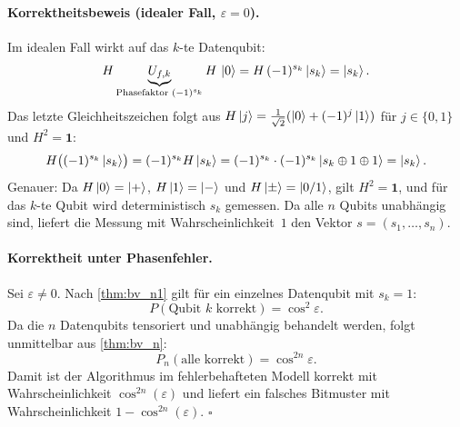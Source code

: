﻿\documentclass[11pt,a4paper]{article}
\theoremstyle{definition}
\newcommand{\eps}{\varepsilon}
\begin{document}
\paragraph{Korrektheitsbeweis (idealer Fall, $\varepsilon=0$).}
Im idealen Fall wirkt auf das $k$-te Datenqubit:
\[
  H \underbrace{U_{f,k}}_{\text{Phasefaktor }(-1)^{s_k}} H\,\ket{0}
  = H\,(-1)^{s_k}\ket{s_k} = \ket{s_k}.
\]
Das letzte Gleichheitszeichen folgt aus $H\ket{j}=\tfrac{1}{\sqrt{2}}(\ket{0}+(-1)^j\ket{1})$
für $j\in\{0,1\}$ und $H^2=\mathbf{1}$:
\[
  H\bigl((-1)^{s_k}\ket{s_k}\bigr) = (-1)^{s_k}H\ket{s_k}
  = (-1)^{s_k}\cdot(-1)^{s_k}\ket{s_k\oplus 1\oplus 1} = \ket{s_k}.
\]
Genauer: Da $H\ket{0}=\ket{+}$, $H\ket{1}=\ket{-}$ und $H\ket{\pm}=\ket{0/1}$,
gilt $H^2=\mathbf{1}$, und für das $k$-te Qubit wird deterministisch $s_k$
gemessen.  Da alle $n$ Qubits unabhängig sind, liefert die Messung mit
Wahrscheinlichkeit~$1$ den Vektor $s=(s_1,\dots,s_n)$.

\paragraph{Korrektheit unter Phasenfehler.}
Sei $\eps\neq 0$.  Nach \cref{thm:bv_n1} gilt für ein einzelnes
Datenqubit mit $s_k=1$:
\[
  P(\text{Qubit }k\text{ korrekt}) = \cos^2\!\eps.
\]
Da die $n$ Datenqubits tensoriert und unabhängig behandelt werden, folgt
unmittelbar aus \cref{thm:bv_n}:
\[
  P_n(\text{alle korrekt}) = \cos^{2n}\!\eps.
\]
Damit ist der Algorithmus im fehlerbehafteten Modell korrekt mit
Wahrscheinlichkeit $\cos^{2n}(\eps)$ und liefert ein falsches Bitmuster
mit Wahrscheinlichkeit $1-\cos^{2n}(\eps)$.  $\square$
\end{document}
